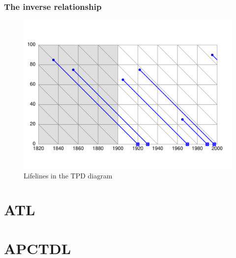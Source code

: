 \documentclass[20pt]{beamer}
\begin{document}
\begin{frame}
\frametitle{The inverse relationship}
\begin{figure}[b]
    \centering
    \includegraphics[scale=.9]{Figures/LabPres/TPD2.pdf}
    \caption{Lifelines in the TPD diagram}
\end{figure} 
\end{frame}

\section{ATL}

\section{APCTDL}
\end{document}
